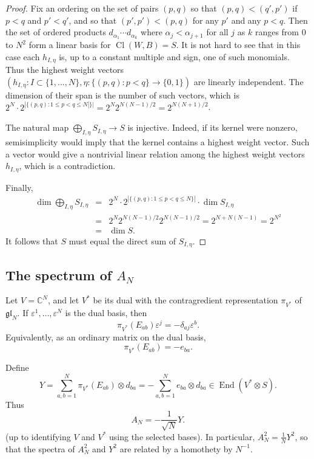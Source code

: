 \documentclass[11pt]{article}
\newcommand{\Cl}{\operatorname{Cl}}
\newcommand{\myd}{d}
\begin{document}
\begin{proof}
    Fix an ordering on the set of pairs $(p,q)$ so that $(p,q)<(q',p')$ if $p<q$ and $p'<q'$, and so that $(p',p')<(p,q)$ for any $p'$ and any $p<q$.  Then the set of ordered products $\myd_{\alpha_1}\cdots \myd_{\alpha_k}$ where $\alpha_j < \alpha_{j+1}$ for all $j$ as $k$ ranges from $0$ to $N^2$ form a linear basis for $\Cl(W,B)=S$.  It is not hard to see that in this case each $h_{I,\eta}$ is, up to a constant multiple and sign, one of such monomials.  Thus the highest weight vectors $(h_{I,\eta} : I\subset \{1,\dots,N\}, \eta:\{(p,q):p<q\}\to \{0,1\})$ are linearly independent. The dimension of their span is the number of such vectors, which is $2^{N}\cdot 2^{|\{(p,q):1\leq p<q\leq N|\}|} = 2^{N}2^{N(N-1)/2} = 2^{N(N+1)/2}$.

    The natural map \( \bigoplus_{I,\eta} S_{I,\eta}\to S\)  is injective. Indeed, if its kernel were nonzero, semisimplicity would imply that the kernel contains a highest weight vector. Such a vector would give a nontrivial linear relation among the highest weight vectors \(h_{I,\eta}\), which is a contradiction. 

    Finally, 
    \begin{eqnarray*}
        \dim \bigoplus_{I,\eta} S_{I,\eta} &=& 2^{N}\cdot  2^{|\{(p,q):1\leq p<q\leq N\}|}\cdot \dim S_{I,\eta} 
        \\ 
    &=& 2^{N} 2^{N(N-1)/2} 2^{N(N-1)/2} = 2^{N+N(N-1)}=2^{N^2} \\
    &=& \dim S.
    \end{eqnarray*}
     It follows that $S$ must equal the direct sum of $S_{I,\eta}$.  
\end{proof}

\subsection{The  spectrum of $A_N$}

Let \(V=\mathbb{C}^N\), and let \(V^*\) be its dual with the contragredient
representation $\pi_{V^*}$ of \(\mathfrak{gl}_N\). If \(\varepsilon^1,\dots,\varepsilon^N\) is the
dual basis, then
\[
        \pi_{V^*}(E_{ab})\varepsilon^j=-\delta_{aj}\varepsilon^b.
\]
Equivalently, as an ordinary matrix on the dual basis,
\[
        \pi_{V^*}(E_{ab})=-e_{ba}.
\]

Define
\[
        Y=\sum_{a,b=1}^N \pi_{V^*}(E_{ab})\otimes\myd_{ba}
        = -\sum_{a,b=1}^N e_{ba}\otimes\myd_{ba} 
        \in \operatorname{End}(V^*\otimes S).
\]
Thus $$A_N = -\frac{1}{\sqrt{N}} Y.$$ (up to identifying $V$ and $V^*$ using the selected bases).  In particular, $A_N^2 = \frac{1}{N}Y^2$, so that the spectra of $A_N^2$ and $Y^2$ are related by a homothety by ${N^{-1}}$.
\end{document}
